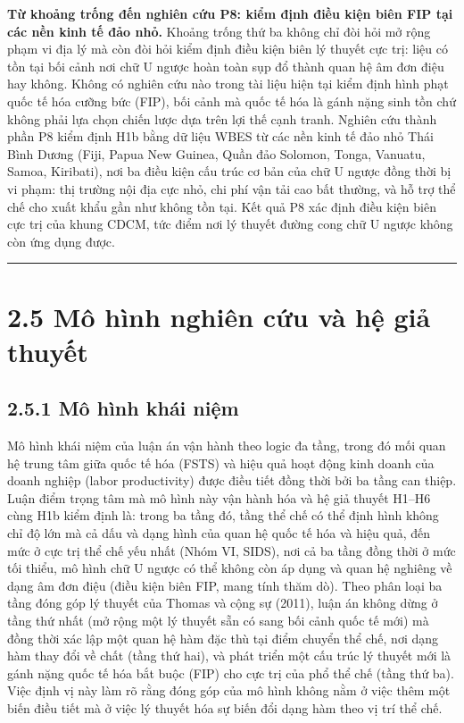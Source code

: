 \documentclass[
  a4paper,
  13pt]{extreport}
\begin{document}
\textbf{Từ khoảng trống đến nghiên cứu P8: kiểm định điều kiện biên FIP
tại các nền kinh tế đảo nhỏ.} Khoảng trống thứ ba không chỉ đòi hỏi mở
rộng phạm vi địa lý mà còn đòi hỏi kiểm định điều kiện biên lý thuyết
cực trị: liệu có tồn tại bối cảnh nơi chữ U ngược hoàn toàn sụp đổ thành
quan hệ âm đơn điệu hay không. Không có nghiên cứu nào trong tài liệu
hiện tại kiểm định hình phạt quốc tế hóa cưỡng bức (FIP), bối cảnh mà
quốc tế hóa là gánh nặng sinh tồn chứ không phải lựa chọn chiến lược dựa
trên lợi thế cạnh tranh. Nghiên cứu thành phần P8 kiểm định H1b bằng dữ
liệu WBES từ các nền kinh tế đảo nhỏ Thái Bình Dương (Fiji, Papua New
Guinea, Quần đảo Solomon, Tonga, Vanuatu, Samoa, Kiribati), nơi ba điều
kiện cấu trúc cơ bản của chữ U ngược đồng thời bị vi phạm: thị trường
nội địa cực nhỏ, chi phí vận tải cao bất thường, và hỗ trợ thể chế cho
xuất khẩu gần như không tồn tại. Kết quả P8 xác định điều kiện biên cực
trị của khung CDCM, tức điểm nơi lý thuyết đường cong chữ U ngược không
còn ứng dụng được.

\begin{center}\rule{0.5\linewidth}{0.5pt}\end{center}

\hypertarget{muxf4-huxecnh-nghiuxean-cux1ee9u-vuxe0-hux1ec7-giux1ea3-thuyux1ebft}{%
\section{2.5 Mô hình nghiên cứu và hệ giả
thuyết}\label{muxf4-huxecnh-nghiuxean-cux1ee9u-vuxe0-hux1ec7-giux1ea3-thuyux1ebft}}

\hypertarget{muxf4-huxecnh-khuxe1i-niux1ec7m}{%
\subsection{2.5.1 Mô hình khái
niệm}\label{muxf4-huxecnh-khuxe1i-niux1ec7m}}

Mô hình khái niệm của luận án vận hành theo logic đa tầng, trong đó mối
quan hệ trung tâm giữa quốc tế hóa (FSTS) và hiệu quả hoạt động kinh
doanh của doanh nghiệp (labor productivity) được điều tiết đồng thời bởi
ba tầng can thiệp. Luận điểm trọng tâm mà mô hình này vận hành hóa và hệ
giả thuyết H1--H6 cùng H1b kiểm định là: trong ba tầng đó, tầng thể chế
có thể định hình không chỉ độ lớn mà cả dấu và dạng hình của quan hệ
quốc tế hóa và hiệu quả, đến mức ở cực trị thể chế yếu nhất (Nhóm VI,
SIDS), nơi cả ba tầng đồng thời ở mức tối thiểu, mô hình chữ U ngược có
thể không còn áp dụng và quan hệ nghiêng về dạng âm đơn điệu (điều kiện
biên FIP, mang tính thăm dò). Theo phân loại ba tầng đóng góp lý thuyết
của Thomas và cộng sự (2011), luận án không dừng ở tầng thứ nhất (mở
rộng một lý thuyết sẵn có sang bối cảnh quốc tế mới) mà đồng thời xác
lập một quan hệ hàm đặc thù tại điểm chuyển thể chế, nơi dạng hàm thay
đổi về chất (tầng thứ hai), và phát triển một cấu trúc lý thuyết mới là
gánh nặng quốc tế hóa bắt buộc (FIP) cho cực trị của phổ thể chế (tầng
thứ ba). Việc định vị này làm rõ rằng đóng góp của mô hình không nằm ở
việc thêm một biến điều tiết mà ở việc lý thuyết hóa sự biến đổi dạng
hàm theo vị trí thể chế.
\end{document}
